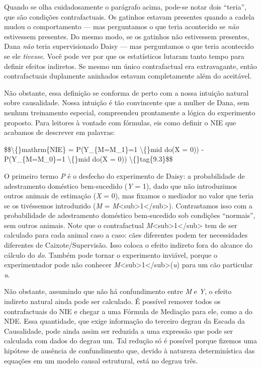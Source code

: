 \documentclass[11pt,a5paper,twoside]{book}
\begin{document}
Quando se olha cuidadosamente o parágrafo acima, pode-se notar dois “teria”, que são condições contrafactuais. Os gatinhos estavam presentes quando a cadela mudou o comportamento — mas perguntamos o que teria acontecido se \textit{não} estivessem presentes. Do mesmo modo, se os gatinhos não estivessem presentes, Dana \textit{não} teria supervisionado Daisy — mas perguntamos o que teria acontecido se ele \textit{tivesse}. Você pode ver por que os estatísticos lutaram tanto tempo para definir efeitos indiretos. Se mesmo um único contrafactual era extravagante, então contrafactuais duplamente aninhados estavam completamente além do aceitável.

Não obstante, essa definição se conforma de perto com a nossa intuição natural sobre causalidade. Nossa intuição é tão convincente que a mulher de Dana, sem nenhum treinamento especial, compreendeu prontamente a lógica do experimento proposto. Para leitores à vontade com fórmulas, eis como definir o NIE que acabamos de descrever em palavras:

\$\$\textbackslash\{\}mathrm\{NIE\} = P(Y\_\{M=M\_1\}=1 \textbackslash\{\}mid do(X = 0)) - P(Y\_\{M=M\_0\}=1 \textbackslash\{\}mid do(X = 0)) \textbackslash\{\}tag\{9.3\}\$\$

O primeiro termo \textit{P} é o desfecho do experimento de Daisy: a probabilidade de adestramento doméstico bem-sucedido (\textit{Y} = 1), dado que não introduzimos outros animais de estimação (\textit{X} = 0), mas fixamos o mediador no valor que teria se os tivéssemos introduzido (\textit{M} = \textit{M}<sub>1</sub>). Contrastamos isso com a probabilidade de adestramento doméstico bem-sucedido sob condições “normais”, sem outros animais. Note que o contrafactual \textit{M}<sub>1</sub> tem de ser calculado para cada animal caso a caso: cães diferentes podem ter necessidades diferentes de Caixote/Supervisão. Isso coloca o efeito indireto fora do alcance do cálculo do \textit{do}. Também pode tornar o experimento inviável, porque o experimentador pode não conhecer \textit{M}<sub>1</sub>(\textit{u}) para um cão particular \textit{u}.

Não obstante, assumindo que não há confundimento entre \textit{M} e \textit{Y}, o efeito indireto natural ainda pode ser calculado. É possível remover todos os contrafactuais do NIE e chegar a uma Fórmula de Mediação para ele, como a do NDE. Essa quantidade, que exige informação do terceiro degrau da Escada da Causalidade, pode ainda assim ser reduzida a uma expressão que pode ser calculada com dados do degrau um. Tal redução só é possível porque fizemos uma hipótese de ausência de confundimento que, devido à natureza determinística das equações em um modelo causal estrutural, está no degrau três.
\end{document}
